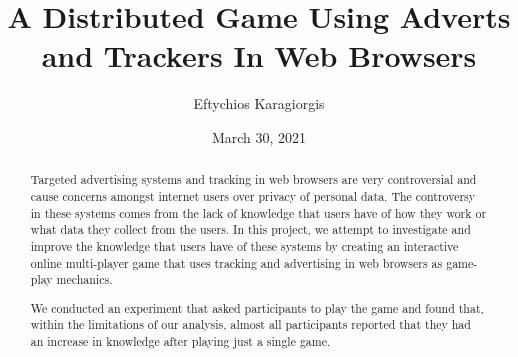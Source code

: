 \documentclass{l4proj}
\begin{document}
\title{A Distributed Game Using Adverts and Trackers In Web Browsers}
\author{Eftychios Karagiorgis}
\date{March 30, 2021}

\maketitle

\begin{abstract}
Targeted advertising systems and tracking in web browsers are very controversial and cause concerns amongst internet users over privacy of personal data. The controversy in these systems comes from the lack of knowledge that users have of how they work or what data they collect from the users. In this project, we attempt to investigate and improve the knowledge that users have of these systems by creating an interactive online multi-player game that uses tracking and advertising in web browsers as game-play mechanics. 

We conducted an experiment that asked participants to play the game and found that, within the limitations of our analysis, almost all participants reported that they had an increase in knowledge after playing just a single game.
\end{abstract}


%
%
%
\educationalconsent


\tableofcontents
\end{document}
